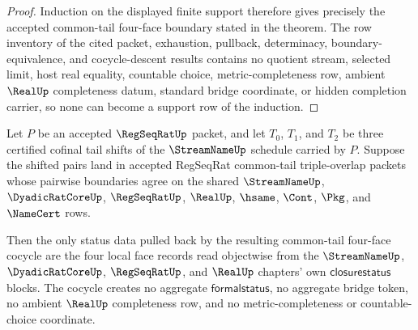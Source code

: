\begin{proof}
Induction on the displayed finite support therefore gives precisely the accepted common-tail four-face boundary stated in the theorem. The row inventory of the cited packet, exhaustion, pullback, determinacy, boundary-equivalence, and cocycle-descent results contains no quotient stream, selected limit, host real equality, countable choice, metric-completeness row, ambient $\RealUp$ completeness datum, standard bridge coordinate, or hidden completion carrier, so none can become a support row of the induction.
\end{proof}

\begin{theorem}
\label{thm:regseqrat-common-tail-face-status-objectwise-pullback}
Let $P$ be an accepted $\RegSeqRatUp$ packet, and let $T_0$, $T_1$, and $T_2$ be three certified cofinal tail shifts of the $\StreamNameUp$ schedule carried by $P$. Suppose the shifted pairs land in accepted RegSeqRat common-tail triple-overlap packets whose pairwise boundaries agree on the shared $\StreamNameUp$, $\DyadicRatCoreUp$, $\RegSeqRatUp$, $\RealUp$, $\hsame$, $\Cont$, $\Pkg$, and $\NameCert$ rows.

Then the only status data pulled back by the resulting common-tail four-face cocycle are the four local face records read objectwise from the $\StreamNameUp$, $\DyadicRatCoreUp$, $\RegSeqRatUp$, and $\RealUp$ chapters' own $\mathsf{closurestatus}$ blocks. The cocycle creates no aggregate $\mathsf{formalstatus}$, no aggregate bridge token, no ambient $\RealUp$ completeness row, and no metric-completeness or countable-choice coordinate.
\end{theorem}
